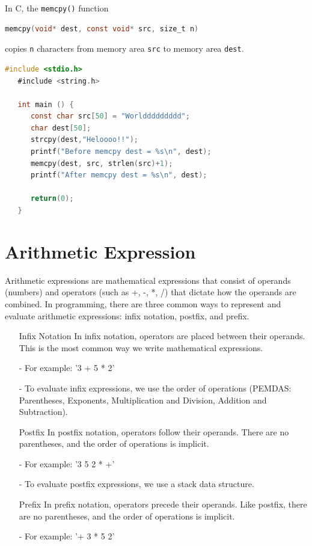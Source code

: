 \documentclass[nobib]{tufte-handout}
\begin{document}
In C, the \texttt{memcpy()} function 
\begin{lstlisting}[language=C]
   memcpy(void* dest, const void* src, size_t n)
   \end{lstlisting}
copies \texttt{n} characters from memory area \texttt{src} to memory area \texttt{dest}.

\begin{lstlisting}[language=C, caption=memcpy]
   #include <stdio.h>
   #include <string.h>

   int main () {
      const char src[50] = "Worlddddddddd";
      char dest[50];
      strcpy(dest,"Heloooo!!");
      printf("Before memcpy dest = %s\n", dest);
      memcpy(dest, src, strlen(src)+1);
      printf("After memcpy dest = %s\n", dest);
      
      return(0);
   }
\end{lstlisting}

\section{Arithmetic Expression}
Arithmetic expressions are mathematical expressions that consist 
of operands (numbers) and operators (such as +, -, *, /) 
that dictate how the operands are combined.
In programming, there are three common ways to represent and 
evaluate arithmetic expressions: infix notation, postfix, and prefix.

\begin{enumerate}
   \item[Infix Notation] In infix notation, operators are placed between their operands. This is the most common way we write mathematical expressions.

      - For example: '3 + 5 * 2'

      - To evaluate infix expressions, we use the order of operations (PEMDAS: Parentheses, Exponents, Multiplication and Division, Addition and Subtraction).
   
   \item[Postfix] In postfix notation, operators follow their operands. There are no parentheses, and the order of operations is implicit.
      
      - For example: '3 5 2 * +'

      - To evaluate postfix expressions, we use a stack data structure.
   
   \item[Prefix] In prefix notation, operators precede their operands. Like postfix, there are no parentheses, and the order of operations is implicit.
     
      - For example: '+ 3 * 5 2'
\end{enumerate}
\end{document}
